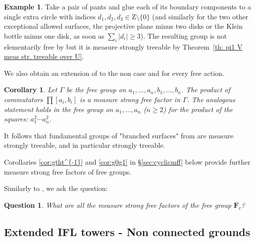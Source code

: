 \documentclass[11pt]{amsart}
\theoremstyle{definition}
\newtheorem{example}[definition]{Example}
\theoremstyle{plain}
\newtheorem{corollary}[definition]{Corollary}
\newtheorem{question}[definition]{Question}
\newcommand{\<}{\langle}
\renewcommand{\>}{\rangle}
\newcommand{\FF}{\mathbf{F}}
\newcommand{\Z}{\bm{\mathrm{Z}}}
\newcommand{\pmp}{\text{p.m.p.}}
\begin{document}
\begin{example}\label{ex: meas str treeable non-elemen free}
Take a pair of pants and glue each of its boundary components to a single extra circle with indices $d_1, d_2, d_3\in \Z\setminus \{0\}$ (and similarly for the two other  exceptional allowed surfaces, the projective plane minus two disks or the Klein bottle minus one disk, as soon as $\sum_i |d_i|\geq 3$).
The resulting group is not elementarily free by \cite[Lemma 10.20]{Guirardel-Levitt-Sklinos-2020} but it is measure strongly treeable by Theorem~\ref{th: pi1 V meas str. treeable over U}.
\end{example}
%
We also obtain an extension of \cite[Th. 3.3]{Ga05} to the non \pmp{} case and for every free action.
\begin{corollary}
Let $\Gamma$ be the free group on $a_1,\dots , a_n, b_1,\dots , b_n$.
The product of commutators $\prod[a_i,b_i]$ is a measure strong free factor in $\Gamma$.
The analogous statement holds in the free group on $a_1,\dots , a_n$ ($n\geq 2$) for the product of the squares: $a_1^2\cdots a_n^2$.
\end{corollary}
It follows that fundamental groups of "branched surfaces" from \cite{Ga05} are measure strongly treeable, and in particular strongly treeable.

Corollaries \ref{cor:gtht^{-1}} and \ref{cor:g0g1} in \S\ref{sec:cyclicmff} below provide further measure strong free factors of free groups.

Similarly to \cite[Question 3.10]{Ga05}, we ask the question:
\begin{question}
 What are all the measure strong free factors of the free group $\FF_r$?
\end{question}

\subsection{Extended IFL towers - Non connected grounds}
\label{sect: extended large towers}
\end{document}
